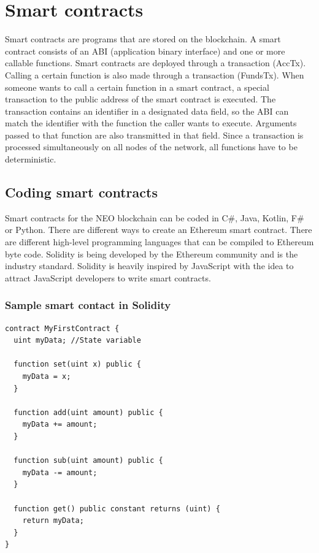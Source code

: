 \section{Smart contracts}
Smart contracts are programs that are stored on the blockchain. A smart contract consists of an ABI (application binary interface) and one or more callable functions. Smart contracts are deployed through a transaction (AccTx). Calling a certain function is also made through a transaction (FundsTx). When someone wants to call a certain function in a smart contract, a special transaction to the public address of the smart contract is executed. The transaction contains an identifier in a designated data field, so the ABI can match the identifier with the function the caller wants to execute. Arguments passed to that function are also transmitted in that field. Since a transaction is processed simultaneously on all nodes of the network, all functions have to be deterministic.

\subsection{Coding smart contracts}
Smart contracts for the NEO blockchain can be coded in C\#, Java, Kotlin, F\# or Python. There are different ways to create an Ethereum smart contract. There are different high-level programming languages that can be compiled to Ethereum byte code. Solidity is being developed by the Ethereum community and is the industry standard. Solidity is heavily inspired by JavaScript with the idea to attract JavaScript developers to write smart contracts.

\subsubsection{Sample smart contact in Solidity}
\begin{lstlisting}[caption={Solidity contract},captionpos=b,label={lst:dialogex}]
contract MyFirstContract {
  uint myData; //State variable

  function set(uint x) public {
    myData = x;
  }

  function add(uint amount) public {
    myData += amount;
  }

  function sub(uint amount) public {
    myData -= amount;
  }

  function get() public constant returns (uint) {
    return myData;
  }
}	
\end{lstlisting}

